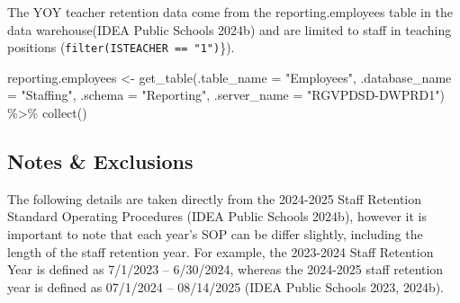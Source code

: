 \documentclass[
  letterpaper,
  DIV=11,
  numbers=noendperiod]{scrreprt}
\newenvironment{Shaded}{\begin{snugshade}}{\end{snugshade}}
\newcommand{\AttributeTok}[1]{\textcolor[rgb]{0.40,0.45,0.13}{#1}}
\newcommand{\FunctionTok}[1]{\textcolor[rgb]{0.28,0.35,0.67}{#1}}
\newcommand{\NormalTok}[1]{\textcolor[rgb]{0.00,0.23,0.31}{#1}}
\newcommand{\OtherTok}[1]{\textcolor[rgb]{0.00,0.23,0.31}{#1}}
\newcommand{\SpecialCharTok}[1]{\textcolor[rgb]{0.37,0.37,0.37}{#1}}
\newcommand{\StringTok}[1]{\textcolor[rgb]{0.13,0.47,0.30}{#1}}
\begin{document}
The YOY teacher retention data come from the reporting.employees table
in the data warehouse(IDEA Public Schools 2024b) and are limited to
staff in teaching positions (\texttt{filter(ISTEACHER\ ==\ "1")}\}).

\begin{Shaded}
\begin{Highlighting}[]
\NormalTok{reporting.employees }\OtherTok{\textless{}{-}} \FunctionTok{get\_table}\NormalTok{(}\AttributeTok{.table\_name =} \StringTok{"Employees"}\NormalTok{,}
                                 \AttributeTok{.database\_name =} \StringTok{"Staffing"}\NormalTok{,}
                                 \AttributeTok{.schema =} \StringTok{"Reporting"}\NormalTok{, }
                                 \AttributeTok{.server\_name =} \StringTok{"RGVPDSD{-}DWPRD1"}\NormalTok{) }\SpecialCharTok{\%\textgreater{}\%} 
  \FunctionTok{collect}\NormalTok{()}
\end{Highlighting}
\end{Shaded}

\subsection{Notes \& Exclusions}\label{sec-retEx}

The following details are taken directly from the 2024-2025 Staff
Retention Standard Operating Procedures (IDEA Public Schools 2024b),
however it is important to note that each year's SOP can be differ
slightly, including the length of the staff retention year. For example,
the 2023-2024 Staff Retention Year is defined as 7/1/2023 -- 6/30/2024,
whereas the 2024-2025 staff retention year is defined as 07/1/2024 --
08/14/2025 (IDEA Public Schools 2023, 2024b).
\end{document}
